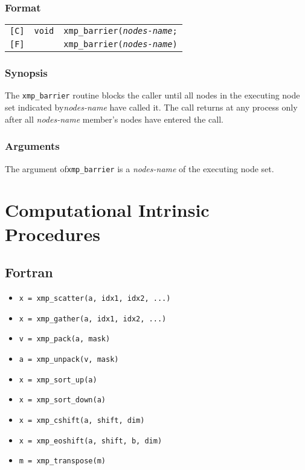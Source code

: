\subsubsection*{Format}

\begin{tabular}{lll}

\verb![C]!&  {\tt void}& {\tt  xmp\_barrier({\it nodes-name};}\\

\verb![F]!&  & {\tt xmp\_barrier({\it nodes-name})}

\end{tabular}

\subsubsection*{Synopsis}
    The {\tt xmp\_barrier} routine blocks the caller until all nodes in the executing node set 
    indicated by{\it nodes-name} have called it.
    The call returns at any process only after all {\it nodes-name} member's nodes
    have entered the call.

\subsubsection*{Arguments}
    The argument of{\tt xmp\_barrier} is a {\it nodes-name} of the executing node set.



\section{Computational Intrinsic Procedures}

\subsection{Fortran}

\begin{itemize}
 \item {\tt x = xmp\_scatter(a, idx1, idx2, ...)}
 \item {\tt x = xmp\_gather(a, idx1, idx2, ...)}
 \item {\tt v = xmp\_pack(a, mask)}
 \item {\tt a = xmp\_unpack(v, mask)}
 \item {\tt x = xmp\_sort\_up(a)}
 \item {\tt x = xmp\_sort\_down(a)}
 \item {\tt x = xmp\_cshift(a, shift, dim)}
 \item {\tt x = xmp\_eoshift(a, shift, b, dim)}
 \item {\tt m = xmp\_transpose(m)}
\end{itemize}


